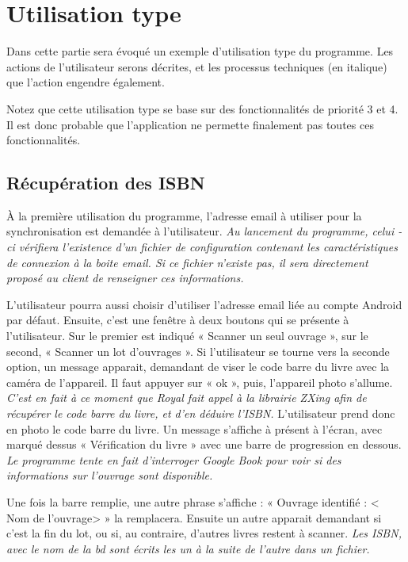 \section{Utilisation type}
Dans cette partie sera évoqué un exemple d'utilisation type du programme.
Les actions de l'utilisateur serons décrites, et les processus techniques (en italique) que l'action engendre également. 

Notez que cette utilisation type se base sur des fonctionnalités de priorité 3 et 4.
Il est donc probable que l'application ne permette finalement pas toutes ces fonctionnalités. 

\subsection{Récupération des ISBN}

À la première utilisation du programme, l'adresse email à utiliser pour la synchronisation est demandée à l'utilisateur.
\emph{Au lancement du programme, celui - ci vérifiera l'existence d'un fichier de configuration contenant les caractéristiques de connexion à la boite email.
	Si ce fichier n'existe pas, il sera directement proposé au client de renseigner ces informations.}

L'utilisateur pourra aussi choisir d'utiliser l'adresse email liée au compte Android par défaut.
Ensuite, c'est une fenêtre à deux boutons qui se présente à l'utilisateur. 
Sur le premier est indiqué « Scanner un seul ouvrage », sur le second, « Scanner un lot d'ouvrages ». 
Si l'utilisateur se tourne vers la seconde option, 
un message apparait, demandant de viser le code barre du livre avec la caméra de l'appareil.
Il faut appuyer sur « ok », puis, l'appareil photo s'allume. 
\emph{C'est en fait à ce moment que Royal fait appel à la librairie ZXing afin de récupérer le code barre du livre, et d'en déduire l'ISBN.} 
L'utilisateur prend donc en photo le code barre du livre.
Un message s'affiche à présent à l'écran, avec marqué dessus « Vérification du livre » avec une barre de progression en dessous.
\emph{Le programme tente en fait d'interroger Google Book pour voir si des informations sur l'ouvrage sont disponible.}

Une fois la barre remplie, une autre phrase s'affiche : « Ouvrage identifié : < Nom de l'ouvrage> » la remplacera.
Ensuite un autre apparait demandant si c'est la fin du lot, ou si, au contraire, d'autres livres restent à scanner. 
\emph{Les ISBN, avec le nom de la bd sont écrits les un à la suite de l'autre dans un fichier.} 

